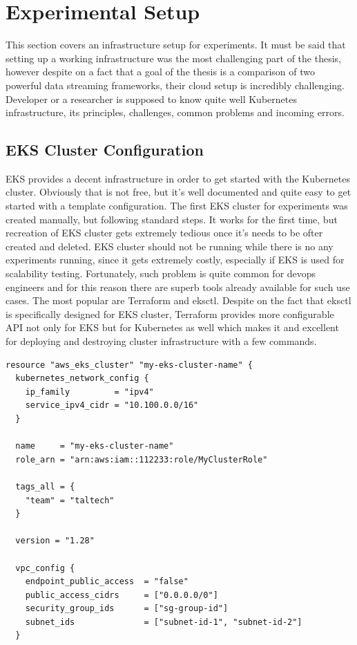 \section{Experimental Setup}\label{sec:exp-setup}
This section covers an infrastructure setup for experiments.
It must be said that setting up a working infrastructure was the most
challenging part of the thesis, however despite on a fact that a goal
of the thesis is a comparison of two powerful data streaming frameworks,
their cloud setup is incredibly challenging.
Developer or a researcher is supposed to know quite well Kubernetes infrastructure,
its principles, challenges, common problems and incoming errors.


\subsection{EKS Cluster Configuration}\label{subsec:eks-cluster-configuration}
EKS provides a decent infrastructure in order to get started with the
Kubernetes cluster.
Obviously that is not free, but it's well documented and quite easy
to get started with a template configuration.
The first EKS cluster for experiments was created manually, but following
standard steps.
It works for the first time, but recreation of EKS cluster gets extremely
tedious once it's needs to be ofter created and deleted.
EKS cluster should not be running while there is no any experiments running, since
it gets extremely costly, especially if EKS is used for scalability testing.
Fortunately, such problem is quite common for devops engineers and for this
reason there are superb tools already available for such use cases.
The most popular are Terraform and eksctl.
Despite on the fact that eksctl is specifically designed for EKS cluster, Terraform
provides more configurable API not only for EKS but for Kubernetes as well which
makes it and excellent for deploying and destroying cluster infrastructure
with a few commands.

\begin{lstlisting}[label={lst:eks-example}]
resource "aws_eks_cluster" "my-eks-cluster-name" {
  kubernetes_network_config {
    ip_family         = "ipv4"
    service_ipv4_cidr = "10.100.0.0/16"
  }

  name     = "my-eks-cluster-name"
  role_arn = "arn:aws:iam::112233:role/MyClusterRole"

  tags_all = {
    "team" = "taltech"
  }

  version = "1.28"

  vpc_config {
    endpoint_public_access  = "false"
    public_access_cidrs     = ["0.0.0.0/0"]
    security_group_ids      = ["sg-group-id"]
    subnet_ids              = ["subnet-id-1", "subnet-id-2"]
  }
\end{lstlisting}

